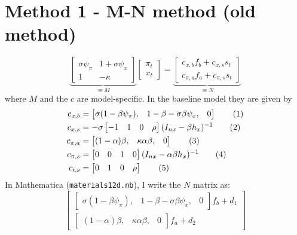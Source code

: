\documentclass[11pt]{article}
\renewcommand{\[}{\begin{equation}}
\renewcommand{\]}{\end{equation}}
\newcommand\numberthis{\addtocounter{equation}{1}\tag{\theequation}} %
\begin{document}
\section{Method 1 - M-N method (old method)}
\begin{equation}
\underbrace{\begin{bmatrix} \sigma\psi_{\pi}&  1+\sigma\psi_x\\ 1& -\kappa \end{bmatrix}}_{\equiv M}\begin{bmatrix} \pi_t \\ x_t \end{bmatrix} = \underbrace{\begin{bmatrix} c_{x,b}f_b +c_{x,s} s_t \\ c_{\pi,a}f_a +c_{\pi,s} s_t \end{bmatrix}}_{\equiv N}
\end{equation}
where $M$ and the $c$ are model-specific. In the baseline model they are given by
\begin{align*}
 c_{x,b} & =  \begin{bmatrix} \sigma(1-\beta\psi_{\pi}), &1-\beta-\sigma\beta\psi_x ,&0 \end{bmatrix} \numberthis\\
 c_{x,s} & =  -\sigma\begin{bmatrix} -1 &1 & 0 & \rho \end{bmatrix}(I_{nx}-\beta h_x)^{-1} \numberthis \\
 c_{\pi,a} & =  \begin{bmatrix} (1-\alpha)\beta, &\kappa\alpha\beta ,& 0 \end{bmatrix} \numberthis \\
 c_{\pi,s} & =  \begin{bmatrix} 0&0 & 1 & 0 \end{bmatrix}(I_{nx}-\alpha\beta h_x)^{-1} \numberthis \\
  c_{i,s} & =  \begin{bmatrix} 0 &1 & 0 & \rho \end{bmatrix} \numberthis
\end{align*}
In Mathematica (\texttt{materials12d.nb}), I write the $N$ matrix as: 
\begin{equation}
\begin{bmatrix}  \begin{bmatrix} \sigma(1-\beta\psi_{\pi}), &1-\beta-\sigma\beta\psi_x ,&0 \end{bmatrix} f_b + d_1 \\ \begin{bmatrix} (1-\alpha)\beta, &\kappa\alpha\beta ,& 0 \end{bmatrix}  f_a + d_2 \end{bmatrix}
\end{equation}
\end{document}
